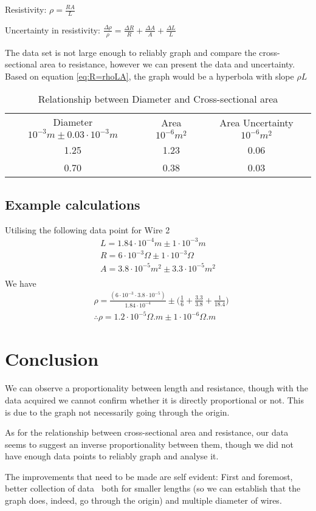 \documentclass[]{article}
\begin{document}
Resistivity: $ \rho = \frac{RA}{L}$

Uncertainty in resistivity: $\frac{\Delta \rho}{\rho} = \frac{\Delta R}{R} + \frac{\Delta A}{A} + \frac{\Delta L}{L}$

\vspace{2cm}
The data set is not large enough to reliably graph and compare the cross-sectional area to resistance, however we can present the data and uncertainty. Based on equation \ref{eq:R=rhoLA},  the graph would be a hyperbola with slope $\rho L$
\begin{table}[h]
\begin{tabular}{ccc}
Diameter $10^{-3} m \pm 0.03\cdot 10^{-3}m$ & Area $10^{-6} m^{2}$ &  Area Uncertainty $10^{-6} m^{2}$\\
1.25 & 1.23 & 0.06\\
0.70 & 0.38 & 0.03 \\
\end{tabular}
\caption{Relationship between Diameter and Cross-sectional area}
\end{table}

\subsection{Example calculations}
Utilising the following data point for Wire 2
\begin{equation*}
\begin{split}
L = 1.84\cdot 10^{-4} m \pm 1\cdot10^{-3}m\\
R = 6 \cdot 10^{-3} \Omega \pm 1\cdot10^{-3} \Omega\\
A = 3.8 \cdot 10^{-5} m^2 \pm 3.3 \cdot 10^{-5} m^2 \\
\end{split}
\end{equation*}
We have
\begin{equation*}
\begin{split}
	&\rho = \frac{(6 \cdot 10^{-3} \cdot 3.8 \cdot 10^{-5})}{1.84 \cdot 10^{-4}} \pm \big( \frac{1}{6} + \frac{3.3}{3.8} + \frac{1}{18.4}\big) \\
	&\therefore \rho = 1.2 \cdot 10^{-5} \Omega.m \pm 1 \cdot 10^{-6}\Omega.m
\end{split}
\end{equation*}

\section{Conclusion}

We can observe a proportionality between length and resistance, though with the data acquired we cannot confirm whether it is directly proportional or not. This is due to the graph not necessarily going through the origin.

As for the relationship between cross-sectional area and resistance, our data seems to suggest an inverse proportionality between them, though we did not have enough data points to reliably graph and analyse it.

The improvements that need to be made are self evident: First and foremost, better collection of data \textendash\ both for smaller lengths (so we can establish that the graph does, indeed, go through the origin) and multiple diameter of wires.
\end{document}
